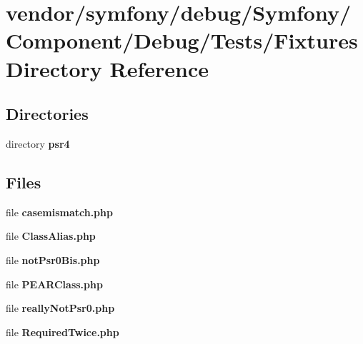 \section{vendor/symfony/debug/\+Symfony/\+Component/\+Debug/\+Tests/\+Fixtures Directory Reference}
\label{dir_5666f60c860f9e1960d88146b85de081}
\subsection*{Directories}
\begin{DoxyCompactItemize}
\item 
directory {\bf psr4}
\end{DoxyCompactItemize}
\subsection*{Files}
\begin{DoxyCompactItemize}
\item 
file {\bf casemismatch.\+php}
\item 
file {\bf Class\+Alias.\+php}
\item 
file {\bf not\+Psr0\+Bis.\+php}
\item 
file {\bf P\+E\+A\+R\+Class.\+php}
\item 
file {\bf really\+Not\+Psr0.\+php}
\item 
file {\bf Required\+Twice.\+php}
\end{DoxyCompactItemize}
